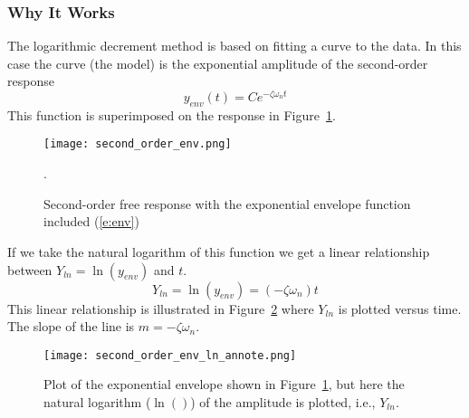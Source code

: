 
\subsubsection{Why It Works}
The logarithmic decrement method is based on fitting a curve to the data.  In this case the curve (the model) is the exponential amplitude of the second-order response
\begin{equation}
y_{env}(t)=C e^{-\zeta\omega_nt}
\label{e:env}
\end{equation}
This function is superimposed on the response in Figure~\ref{f:env}.
\begin{figure}[h!bt]
\centerline{
{\texttt{[image: second\_order\_env.png]}}}
\caption{Second-order free response with the exponential envelope function included (\ref{e:env})}.
\label{f:env}
\end{figure}

If we take the natural logarithm of this function we get a linear relationship between $Y_{ln}=\ln(y_{env})$ and $t$.
\[
Y_{ln}=\ln(y_{env})=(-\zeta \omega_n) t
\]
This linear relationship is illustrated in Figure~\ref{f:ln} where $Y_{ln}$ is plotted versus time.  The slope of the line is $m=-\zeta \omega_n$.
\begin{figure}[hbt!]
\centerline{
{\texttt{[image: second\_order\_env\_ln\_annote.png]}}}
\caption{Plot of the exponential envelope shown in Figure~\ref{f:env}, but here the natural logarithm ($\ln()$) of the amplitude is plotted, i.e., $Y_{ln}$.}
\label{f:ln}
\end{figure}

